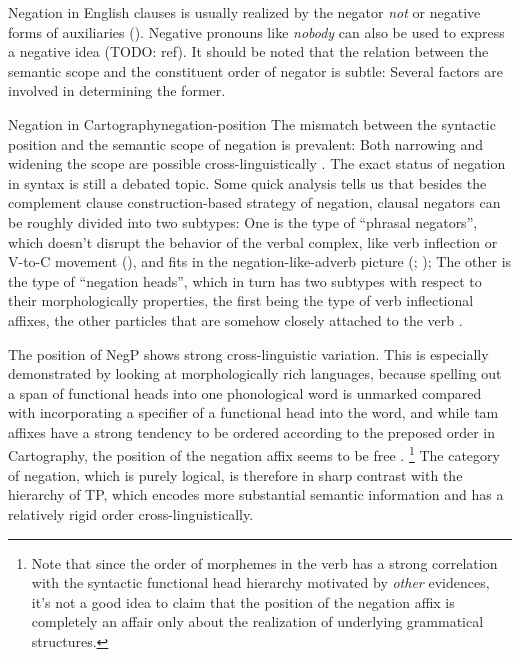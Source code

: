 \documentclass[UTF8, a4paper, oneside, scheme=plain]{ctexrep}
\newcommand*{\citesec}[1]{\S~{#1}}
\newcommand*{\citepage}[1]{pp.~{#1}}
\newcommand{\corpus}[1]{\emph{#1}}
\begin{document}
Negation in English clauses is usually realized by the negator \corpus{not}
or negative forms of auxiliaries (). 
Negative pronouns like \corpus{nobody} can also be used to express a negative idea (TODO: ref).
It should be noted that the relation between the semantic scope and the constituent order of negator 
is subtle:
Several factors are involved in determining the former.

\begin{theorybox}{Negation in Cartography}{negation-position}
    The mismatch between the syntactic position and the semantic scope of negation 
    is prevalent: Both narrowing and widening the scope are possible cross-linguistically
    \cite[\citepage{40}]{moscati2010negation}.
    The exact status of negation in syntax is still a debated topic.
    Some quick analysis tells us that besides 
    the complement clause construction-based strategy of negation,
    clausal negators can be roughly divided into two subtypes:
    One is the type of ``phrasal negators'',
    which doesn't disrupt the behavior of the verbal complex,
    like verb inflection or V-to-C movement (),
    and fits in the negation-like-adverb picture 
    (\citealt[\citepage{101}]{zanuttini1997negation};
    \citealt[\citesec{4.7}]{radford2009analysing});
    The other is the type of ``negation heads'',
    which in turn has two subtypes with respect to their morphologically properties,
    the first being the type of verb inflectional affixes,
    the other particles that are somehow closely attached to the verb \citep{zeijlstra2013}.    

    The position of NegP shows strong cross-linguistic variation.
    This is especially demonstrated by looking at morphologically rich languages,
    because spelling out a span of functional heads into one phonological word
    is unmarked compared with incorporating a specifier of a functional head 
    into the word,
    and while \acs{tam} affixes have a strong tendency to be ordered 
    according to the preposed order in Cartography, 
    the position of the negation affix seems to be free \citep[\citepage{15}]{moscati2010negation}.%
    \footnote{
        Note that since the order of morphemes in the verb has a strong correlation 
        with the syntactic functional head hierarchy motivated by \emph{other} evidences,
        it's not a good idea to claim that the position of the negation affix 
        is completely an affair only about the realization of underlying grammatical structures.
    }
    The category of negation, which is purely logical, is therefore in sharp contrast with 
    the hierarchy of TP, 
    which encodes more substantial semantic information
    and has a relatively rigid order cross-linguistically.


\end{theorybox}
\end{document}

